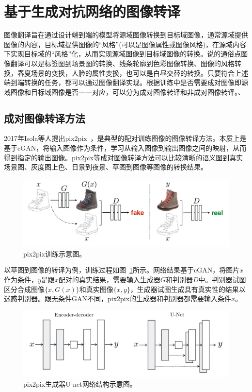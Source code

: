 \section{基于生成对抗网络的图像转译}
图像翻译旨在通过设计端到端的模型将源域图像转换到目标域图像，通常源域提供图像的内容，目标域提供图像的“风格”(可以是图像属性或图像风格)，在源域内容下实现目标域的“风格”化，从而实现源域图像到目标域图像的转换。说的通俗点图像翻译可以是标签图到场景图的转换、线条轮廓到色彩图像转换、图像的风格转换，春夏场景的变换，人脸的属性变换，也可以是白昼交替的转换。只要符合上述端到端转换的任务，都可以通过图像翻译实现。根据训练中是否需要成对图像即源域图像和目标域图像是否一一对应，可以分为成对图像转译和非成对图像转译。、


\subsection{成对图像转译方法}
2017年Isola等人提出pix2pix~\cite{isola2017image}，是典型的配对训练图像的图像转译方法。本质上是基于cGAN，将输入图像作为条件，学习从输入图像到输出图像之间的映射，从而得到指定的输出图像。pix2pix等成对图像转译方法可以比较清晰的语义图到真实场景图、灰度图上色、日景到夜景、草图到图像等图像的转换结果。

\begin{figure}[ht]
    \centering
	\includegraphics[width=\textwidth]{figures/pix2pix.pdf}
	\caption{pix2pix训练示意图。}
	\label{fig:pix2pix}
\end{figure}

以草图到图像的转译为例，训练过程如图~\ref{fig:pix2pix}所示。网络结果基于cGAN，将图片$x$作为条件，$y$是跟$x$配对的真实结果，需要输入生成器$G$和判别器$D$中。判别器试图区分合成图像$\{x,G(x)\}$和真实图像$\{x,y\}$，生成器试图生成具有真实性的结果以迷惑判别器。跟无条件GAN不同，pix2pix的生成器和判别器都需要输入条件$x$。

\begin{figure}[ht]
    \centering
	\includegraphics[width=\textwidth]{figures/unet.pdf}
	\caption{pix2pix生成器U-net网络结构示意图。}
	\label{fig:unet}
\end{figure}


